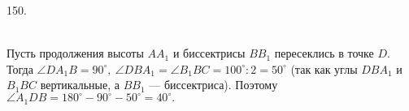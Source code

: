 150. \begin{figure}[ht!]
\end{figure}\\
Пусть продолжения высоты $AA_1$ и биссектрисы $BB_1$ пересеклись в точке $D.$ Тогда $\angle DA_1B=90^\circ,\ \angle DBA_1=\angle B_1BC=100^\circ:2=50^\circ$ (так как углы $DBA_1$ и $B_1BC$ вертикальные, а $BB_1$ --- биссектриса). Поэтому $\angle A_1DB=180^\circ-90^\circ-50^\circ=40^\circ.$\\
